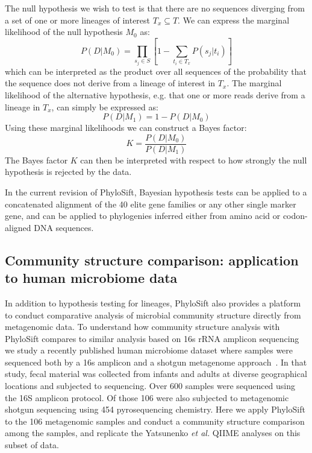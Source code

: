 \documentclass[10pt]{article}
\begin{document}
The null hypothesis we wish to test is that there are no sequences diverging from a set of one or more lineages of interest $T_x \subseteq T$.
We can express the marginal likelihood of the null hypothesis $M_0$ as:
\begin{equation}\label{eqn:null}
P(D|M_0) = \prod_{s_j \in S} \left[ 1 - \sum_{t_i \in T_x} P(s_j|t_i) \right]
\end{equation}
which can be interpreted as the product over all sequences of the probability that the sequence does not derive from a lineage of interest in $T_x$.
The marginal likelihood of the alternative hypothesis, e.g. that one or more reads derive from a lineage in $T_x$, can simply be expressed as:
\begin{equation}\label{eqn:alt}
P(D|M_1) = 1-P(D|M_0)
\end{equation}
Using these marginal likelihoods we can construct a Bayes factor:
\begin{equation}\label{eqn:bayesfactor}
K=\frac{P(D|M_0)}{P(D|M_1)}
\end{equation}
The Bayes factor $K$ can then be interpreted with respect to how strongly the null hypothesis is rejected by the data.

In the current revision of PhyloSift, Bayesian hypothesis tests can be applied to a concatenated alignment of the 40 elite gene families or any other single marker gene, and can be applied to phylogenies inferred either from amino acid or codon-aligned {DNA} sequences.

\subsection*{Community structure comparison: application to human microbiome data}

In addition to hypothesis testing for lineages, PhyloSift also provides a platform to conduct comparative analysis of microbial community structure directly from metagenomic data.
To understand how community structure analysis with PhyloSift compares to similar analysis based on 16s rRNA amplicon sequencing we study a recently published human microbiome dataset where samples were sequenced both by a 16s amplicon and a shotgun metagenome approach~\cite{Yatsunenko2012}.
In that study, fecal material was collected from infants and adults at diverse geographical locations and subjected to sequencing.
Over 600 samples were sequenced using the 16S amplicon protocol.
Of those 106 were also subjected to metagenomic shotgun sequencing using 454 pyrosequencing chemistry.
Here we apply PhyloSift to the 106 metagenomic samples and conduct a community structure comparison among the samples, and replicate the Yatsunenko \textit{et al.} QIIME analyses on this subset of data.
\end{document}
